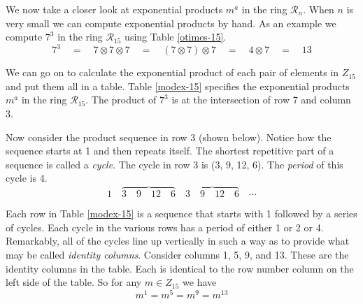 
We now take a closer look at exponential products $m^a$ in the ring $\mathcal{R}_n$.
When $n$ is very small we can compute exponential products by hand.
As an example we compute $7^3$ in the ring $\mathcal{R}_{15}$ using Table \ref{otimes-15}.
\[  7^3 \quad = \quad 7 \otimes 7 \otimes 7 \quad = \quad (7 \otimes 7) \otimes 7 \quad 
= \quad 4 \otimes 7 \quad = \quad 13  \]

We can go on to calculate the exponential product 
of each pair of elements in $Z_{15}$ and put them all in a table.
Table \ref{modex-15} specifies the exponential products $m^a$ in the ring $\mathcal{R}_{15}$.
The product of $7^3$ is at the intersection of row 7 and column 3.
\vspace{2ex}
\begin{table}[!h]
  \begin{center}
    
    \caption{$m^a \quad (\mathcal{R}_{15})$}
    \label{modex-15}
  \end{center}
\end{table}

Now consider the product sequence in row 3 (shown below).
Notice how the sequence starts at 1 and then repeats itself.
The shortest repetitive part of a sequence is called a \emph{cycle}.
The cycle in row 3 is (3, 9, 12, 6).
The \emph{period} of this cycle is 4.
\[ 1 \quad \overbrace{3 \quad 9 \quad 12 \quad 6}
     \quad \overbrace{3 \quad 9 \quad 12 \quad 6} \quad \cdots \]

Each row in Table \ref{modex-15} is a sequence that starts with 1 followed by a series of cycles.
Each cycle in the various rows has a period of either 1 or 2 or 4.
Remarkably, all of the cycles line up vertically in such a way
as to provide what may be called \emph{identity columns}.
Consider columns 1, 5, 9, and 13.  These are the identity columns in the table.
Each is identical to the row number column on the left side of the table.
So for any $m \in Z_{15}$ we have
\[  m^1 =  m^5  =  m^9  =  m^{13}  \]

